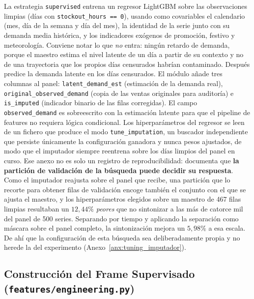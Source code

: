 La estrategia \texttt{supervised} entrena un regresor LightGBM sobre las observaciones limpias (días con \texttt{stockout\_hours == 0}), usando como covariables el calendario (mes, día de la semana y día del mes), la identidad de la serie junto con su demanda media histórica, y los indicadores exógenos de promoción, festivo y meteorología. Conviene notar lo que \emph{no} entra: ningún retardo de demanda, porque el maestro estima el nivel latente de un día a partir de su contexto y no de una trayectoria que los propios días censurados habrían contaminado. Después predice la demanda latente en los días censurados. El módulo añade tres columnas al panel: \texttt{latent\_}\allowbreak\texttt{demand\_}\allowbreak\texttt{est} (estimación de la demanda real), \texttt{original\_}\allowbreak\texttt{observed\_}\allowbreak\texttt{demand} (copia de las ventas originales para auditoría) e \texttt{is\_imputed} (indicador binario de las filas corregidas). El campo \texttt{observed\_demand} es sobreescrito con la estimación latente para que el pipeline de features no requiera lógica condicional. Los hiperparámetros del regresor se leen de un fichero que produce el modo \texttt{tune\_imputation}, un buscador independiente que persiste únicamente la configuración ganadora y nunca pesos ajustados, de modo que el imputador siempre reentrena sobre los días limpios del panel en curso. Ese anexo no es solo un registro de reproducibilidad: documenta que \textbf{la partición de validación de la búsqueda puede decidir su respuesta}. Como el imputador reajusta sobre el panel que recibe, una partición que lo recorte para obtener filas de validación encoge también el conjunto con el que se ajusta el maestro, y los hiperparámetros elegidos sobre un maestro de 467 filas limpias resultaban un $12{,}44\%$ \emph{peores} que no sintonizar a las más de catorce mil del panel de 500 series. Separando por tiempo y aplicando la separación como máscara sobre el panel completo, la sintonización mejora un $5{,}98\%$ a esa escala. De ahí que la configuración de esta búsqueda sea deliberadamente propia y no herede la del experimento (Anexo~\ref{anx:tuning_imputador}).

\subsection{Construcción del Frame Supervisado (\texttt{features/engineering.py})}

